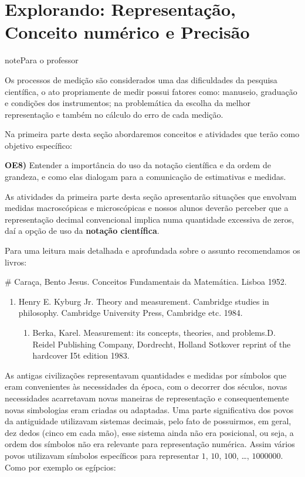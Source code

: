 \section{Explorando: Representação, Conceito numérico e Precisão}
\label{\detokenize{NO103-3::doc}}\label{\detokenize{NO103-3:explorando-representacao-conceito-numerico-e-precisao}}
\begin{sphinxadmonition}{note}{Para o professor}

Os processos de medição são considerados uma das dificuldades da pesquisa científica, o ato propriamente de medir possui fatores como: manuseio, graduação e condições dos instrumentos; na problemática da escolha da melhor representação e também no cálculo do erro de cada medição.

Na primeira parte desta seção abordaremos conceitos e atividades que terão como objetivo específico:

\textbf{OE8)} Entender a importância do uso da notação científica e da ordem de grandeza, e como elas dialogam para a comunicação de estimativas e medidas.

As atividades da primeira parte desta seção apresentarão situações que envolvam medidas macroscópicas e microscópicas e nossos alunos deverão perceber que a representação decimal convencional implica numa quantidade excessiva de zeros, daí a opção de uso da \textbf{notação científica}.

Para uma leitura mais detalhada e aprofundada sobre o assunto recomendamos os livros:

\# Caraça, Bento Jesus. Conceitos Fundamentais da Matemática. Lisboa 1952.
\end{sphinxadmonition}
\begin{enumerate}
\item {} 
Henry E. Kyburg Jr. Theory and measurement. Cambridge studies in philosophy. Cambridge University Press, Cambridge etc. 1984.
\begin{enumerate}
\item {} 
Berka, Karel. Measurement: its concepts, theories, and problems.D. Reidel Publishing Company, Dordrecht, Holland Sotkover reprint of the hardcover I5t edition 1983.

\end{enumerate}

\end{enumerate}

As antigas civilizações representavam quantidades e medidas por símbolos que eram convenientes às necessidades da época, com o decorrer dos séculos, novas necessidades acarretavam novas maneiras de representação  e consequentemente novas simbologias eram criadas ou adaptadas. Uma parte significativa dos povos da antiguidade utilizavam sistemas decimais, pelo fato de possuirmos, em geral, dez dedos (cinco em cada mão), esse sistema ainda não era posicional, ou seja, a ordem dos símbolos não era relevante para representação numérica. Assim vários povos utilizavam símbolos específicos para representar \(1\), \(10\), \(100\), …, \(1 000 000\). Como por exemplo os egípcios:

